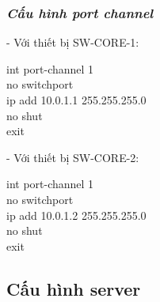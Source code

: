 \documentclass[12pt, a4paper]{article}
\begin{document}
	\newpage
	\subsubsection{\textit{Cấu hình port channel}}
	\begin{flushleft}
		- Với thiết bị SW-CORE-1:
		\begin{tcolorbox}
			int port-channel 1\\
			no switchport\\
			ip add 10.0.1.1 255.255.255.0\\
			no shut\\
			exit
		\end{tcolorbox}
		- Với thiết bị SW-CORE-2:
		\begin{tcolorbox}
			int port-channel 1\\
			no switchport\\
			ip add 10.0.1.2 255.255.255.0\\
			no shut\\
			exit
		\end{tcolorbox}
	\end{flushleft}
		
	\newpage
	\subsection{Cấu hình server}
\end{document}
